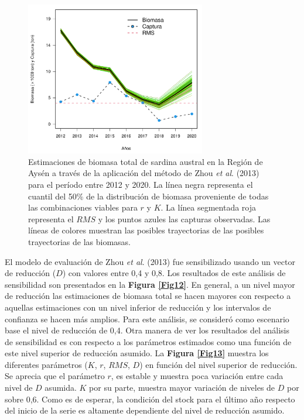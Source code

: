 \documentclass[
  spanish,
]{article}
\begin{document}
\begin{figure}[h!]
\centering
\includegraphics[width=0.7\textwidth]{Figuras/Fig1_Zhou2013_biomasa-1.pdf}
\caption{Estimaciones de biomasa total de sardina austral en la Región de Aysén a través de la aplicación del método de Zhou \textit{et al}. (2013) para el período entre 2012 y 2020. La línea negra representa el cuantil del 50\% de la distribución de biomasa proveniente de todas las combinaciones viables para $r$ y $K$. La línea segmentada roja representa el $RMS$ y los puntos azules las capturas observadas. Las líneas de colores muestran las posibles trayectorias de las posibles trayectorias de las biomasas.}
\label{Fig11}
\end{figure}

\pagebreak

El modelo de evaluación de Zhou \emph{et al}. (2013) fue sensibilizado
usando un vector de reducción (\(D\)) con valores entre 0,4 y 0,8. Los
resultados de este análisis de sensibilidad son presentados en la
\textbf{Figura \ref{Fig12}}. En general, a un nivel mayor de reducción
las estimaciones de biomasa total se hacen mayores con respecto a
aquellas estimaciones con un nivel inferior de reducción y los
intervalos de confianza se hacen más amplios. Para este análisis, se
consideró como escenario base el nivel de reducción de 0,4. Otra manera
de ver los resultados del análisis de sensibilidad es con respecto a los
parámetros estimados como una función de este nivel superior de
reducción asumido. La \textbf{Figura \ref{Fig13}} muestra los diferentes
parámetros (\(K\), \(r\), \(RMS\), \(D\)) en función del nivel superior
de reducción. Se aprecia que el parámetro \(r\), es estable y muestra
poca variación entre cada nivel de \(D\) asumida. \(K\) por su parte,
muestra mayor variación de niveles de \(D\) por sobre 0,6. Como es de
esperar, la condición del stock para el último año respecto del inicio
de la serie es altamente dependiente del nivel de reducción asumido.
\end{document}
